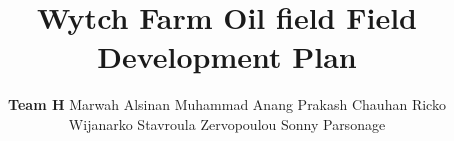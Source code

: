 \documentclass[a4paper,12pt,twoside]{report}
\begin{document}
\title{\LARGE {\bf Wytch Farm Oil field \break Field Development Plan}\\
 \vspace*{6mm}
}

\author{
\textbf{Team H} 
\break 
\break
Marwah Alsinan \break 
Muhammad Anang \break
Prakash Chauhan\break
Ricko Wijanarko\break
Stavroula Zervopoulou\break
Sonny Parsonage\break
}
\break


\normallinespacing
\maketitle

\preface
\body


















\appendix




\end{document}
